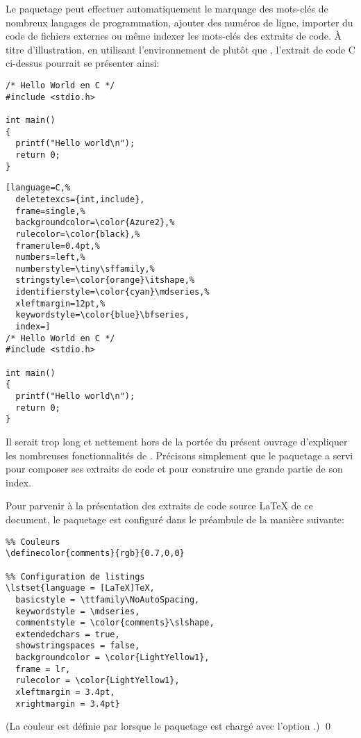 Le paquetage  peut effectuer automatiquement le marquage
des mots-clés de nombreux langages de programmation, ajouter des
numéros de ligne, importer du code de fichiers externes ou même
indexer les mots-clés des extraits de code. À titre d'illustration, en
utilisant l'environnement  de  plutôt que
, l'extrait de code C ci-dessus pourrait se présenter
ainsi:
\begin{demo}
  \begin{texample}
    \begin{vglisting}
\begin{lstlisting}
/* Hello World en C */
#include <stdio.h>

int main()
{
  printf("Hello world\n");
  return 0;
}
\end{lstlisting}
    \end{vglisting}
    \producing
\begin{lstlisting}[language=C,%
  deletetexcs={int,include},
  frame=single,%
  backgroundcolor=\color{Azure2},%
  rulecolor=\color{black},%
  framerule=0.4pt,%
  numbers=left,%
  numberstyle=\tiny\sffamily,%
  stringstyle=\color{orange}\itshape,%
  identifierstyle=\color{cyan}\mdseries,%
  xleftmargin=12pt,%
  keywordstyle=\color{blue}\bfseries,
  index=]
/* Hello World en C */
#include <stdio.h>

int main()
{
  printf("Hello world\n");
  return 0;
}
\end{lstlisting}
  \end{texample}
\end{demo}

Il serait trop long et nettement hors de la portée du présent ouvrage
d'expliquer les nombreuses fonctionnalités de .
Précisons simplement que le paquetage a servi pour composer ses
extraits de code et pour construire une grande partie de son index.

\begin{exemple}
  \label{ex:trucs:listings}
  Pour parvenir à la présentation des extraits de code source {\LaTeX}
  de ce document, le paquetage  est configuré dans le
  préambule de la manière suivante:
\begin{lstlisting}
%% Couleurs
\definecolor{comments}{rgb}{0.7,0,0}

%% Configuration de listings
\lstset{language = [LaTeX]TeX,
  basicstyle = \ttfamily\NoAutoSpacing,
  keywordstyle = \mdseries,
  commentstyle = \color{comments}\slshape,
  extendedchars = true,
  showstringspaces = false,
  backgroundcolor = \color{LightYellow1},
  frame = lr,
  rulecolor = \color{LightYellow1},
  xleftmargin = 3.4pt,
  xrightmargin = 3.4pt}
\end{lstlisting}
  (La couleur  est définie par  lorsque
  le paquetage est chargé avec l'option .)
  \qed
\end{exemple}



